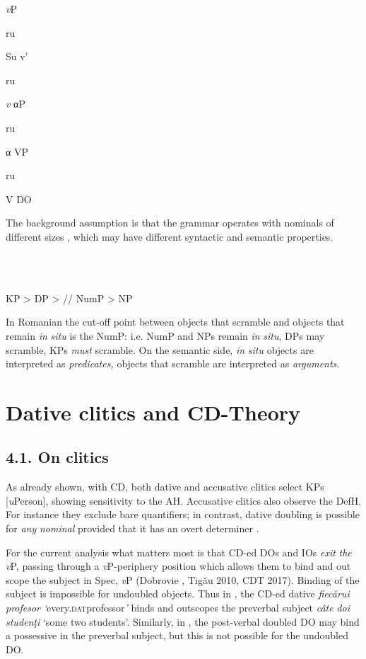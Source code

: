 \documentclass[output=paper,modfonts,nonflat]{langsci/langscibook}
\begin{document}
     \textit{v}P

  ru

  Su    v’

      ru

    \textit{v}    αP

      ru

      α    VP

            ru

            V    DO

The background assumption is that the grammar operates with nominals of different sizes , which may have different syntactic and semantic properties. 

\ea%
    \label{ex:key:26}
    \gll\\
        \\
    \glt
    \z

          KP  >  DP  >  //  NumP  > NP

In Romanian the cut-off point between objects that scramble and objects that remain \textit{in} \textit{situ} is the NumP: i.e. NumP and NPs remain \textit{in} \textit{situ}, DPs may scramble, KPs \textit{must} scramble. On the semantic side, \textit{in} \textit{situ} objects are interpreted as \textit{predicates,} objects that scramble are interpreted as \textit{arguments.}

\section{Dative clitics and CD-Theory} %

\subsection{\textbf{4.1.} \textbf{On} \textbf{clitics}}

As already shown, with CD, both dative and accusative clitics select KPs [\textit{u}Person], showing sensitivity to the AH. Accusative clitics also observe the DefH. For instance they exclude bare quantifiers; in contrast, dative doubling is possible for \textit{any} \textit{nominal} provided that it has an overt determiner \citep{Cornilescu2017}.

For the current analysis what matters most is that CD-ed DOs and IOs \textit{exit} \textit{the} \textit{v}P, passing through a \textit{v}P-periphery position which allows them to bind and out scope the subject in Spec, \textit{v}P (Dobrovie \citealt{Sorin1994}, Tigău 2010, CDT 2017). Binding of the subject is impossible for undoubled objects. Thus in , the CD-ed dative \textit{fiecărui} \textit{profesor} \textit{‘}every.\textsc{dat}professor\textit{’} binds and outscopes the preverbal subject \textit{câte} \textit{doi} \textit{studenţi} ‘some two students’. Similarly, in , the post-verbal doubled DO may bind a possessive in the preverbal subject, but this is not possible for the undoubled DO. 
\end{document}
